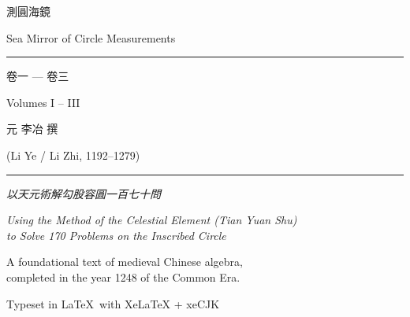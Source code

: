 \documentclass[11pt,a4paper]{article}
\begin{document}
\begin{titlepage}
\centering
\vspace*{2cm}

{\fontsize{36}{44}\selectfont{}\color{titlecolor}
測圓海鏡}

\vspace{0.8cm}

{\fontsize{18}{22}\selectfont\color{sectioncolor}
Sea Mirror of Circle Measurements}

\vspace{0.5cm}

{\large\color{rulecolor}\rule{0.6\textwidth}{0.4pt}}

\vspace{0.8cm}

{\LARGE 卷一 — 卷三}

{\large Volumes I – III}

\vspace{1.5cm}

{\large\color{sectioncolor}
元 \quad 李冶 \quad 撰}

\vspace{0.3cm}

{\normalsize\color{sectioncolor}
(Li Ye / Li Zhi, 1192–1279)}

\vspace{2cm}

{\color{rulecolor}\rule{0.4\textwidth}{0.4pt}}

\vspace{1cm}

{\normalsize
\textit{以天元術解勾股容圓一百七十問}}

\vspace{0.3cm}

{\small\color{notecolor}
\textit{Using the Method of the Celestial Element (Tian Yuan Shu)}\\
\textit{to Solve 170 Problems on the Inscribed Circle}}

\vspace{1.5cm}

{\small
A foundational text of medieval Chinese algebra,\\
completed in the year 1248 of the Common Era.
}

\vfill

{\small Typeset in \LaTeX\ with XeLaTeX + xeCJK}

\end{titlepage}

\tableofcontents
\newpage
\end{document}

